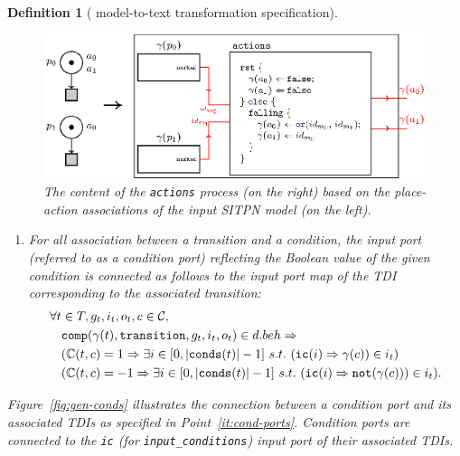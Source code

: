 \documentclass[pdflatex,sn-mathphys]{sn-jnl}%
\theoremstyle{thmstyleone}%
\theoremstyle{thmstyletwo}%
\theoremstyle{thmstylethree}%
\newtheorem{definition}{Definition}%
\begin{document}
\begin{definition}[\hilecop{} model-to-text transformation specification]
  \begin{figure}[!ht]
    \centering
    \includegraphics[keepaspectratio,width=\textwidth]{gen-actions.eps}
    \caption{The content of the \texttt{actions} process (on the
      right) based on the place-action associations of the input SITPN
      model (on the left). }
    \label{fig:gen-actions}
  \end{figure}

  \bigskip
  
  \begin{enumerate}[resume]
  \item\label{it:cond-ports} For all association between a transition and a condition, the
    input port (referred to as a \textit{condition} port) reflecting
    the Boolean value of the given condition is connected as follows
    to the input port map of the TDI corresponding to the associated
    transition:
    \begin{equation*}
      \begin{aligned}[t]
        \forall{}t&\in{}T,g_t,i_t,o_t,c\in\mathcal{C}, \\
                  & \mathtt{comp}(\gamma(t),\mathtt{transition},g_t,i_t,o_t)\in{}d.beh\Rightarrow \\
                  & (\mathbb{C}(t,c)=1\Rightarrow\exists{}i\in[0,\vert\mathtt{conds}(t)\vert-1]~s.t.~(\mathtt{ic}(i)\Rightarrow{}\gamma(c))\in{}i_t) \\
                  & (\mathbb{C}(t,c)=-1\Rightarrow\exists{}i\in[0,\vert\mathtt{conds}(t)\vert-1]~s.t.~(\mathtt{ic}(i)\Rightarrow{}\mathtt{not}(\gamma(c)))\in{}i_t). \\
      \end{aligned}
    \end{equation*}

  \end{enumerate}

  Figure~\ref{fig:gen-conds} illustrates the connection between a
  condition port and its associated TDIs as specified in
  Point~\ref{it:cond-ports}. Condition ports are connected to the
  \texttt{ic} (for \texttt{input\_conditions}) input port of their
  associated TDIs.
  

\end{definition}
\end{document}
